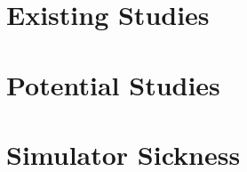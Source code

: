 \documentclass{article}
\begin{document}
\section{Existing Studies}


\section{Potential Studies}



\section{Simulator Sickness}



{}
\end{document}
